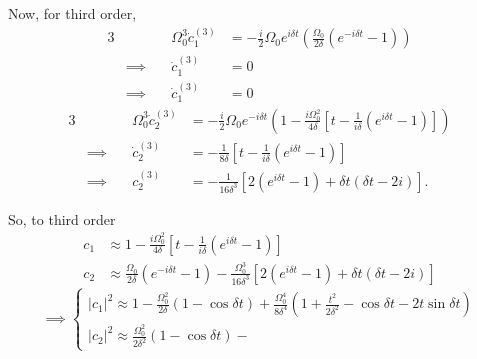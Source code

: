 \documentclass[12pt]{article}
\newcommand{\magsq}[1]{\big|#1\big|^2}
\begin{document}
Now, for third order,
\begin{alignat*}{3}
    &\quad & \Omega_0^3\dot{c}_1^{(3)} &= -\frac{i}{2}\Omega_0e^{i\delta t}\left(\frac{\Omega_0}{2\delta}\left(e^{-i\delta t} - 1\right)\right) \\
    &\implies\quad & \dot{c}_1^{(3)} &= 0 \\
    &\implies\quad & \dot{c}_1^{(3)} & = 0
\end{alignat*}
\begin{alignat*}{3}
    &\quad & \Omega_0^3\dot{c}_2^{(3)} &= -\frac{i}{2}\Omega_0e^{-i\delta t}\left(1 - \frac{i\Omega_0^2}{4\delta}\left[t - \frac{1}{i\delta}\left(e^{i\delta t} - 1\right)\right]\right) \\
    &\implies\quad & \dot{c}_2^{(3)} &= -\frac{1}{8\delta}\left[t - \frac{1}{i\delta}\left(e^{i\delta t} - 1\right)\right] \\
    &\implies\quad & c_2^{(3)} &= -\frac{1}{16\delta^3}\left[2\left(e^{i\delta t} - 1\right) + \delta t (\delta t - 2i)\right].
\end{alignat*}

So, to third order
\begin{equation*}
    \begin{aligned}
        c_1 &\approx 1 - \frac{i\Omega_0^2}{4\delta}\left[t - \frac{1}{i\delta}\left(e^{i\delta t} - 1\right)\right] \\
        c_2 &\approx \frac{\Omega_0}{2\delta}\left(e^{-i\delta t} - 1\right) - \frac{\Omega_0^3}{16\delta^3}\left[2\left(e^{i\delta t} - 1\right) + \delta t (\delta t - 2i)\right]
    \end{aligned}
\end{equation*}
\begin{equation*}
    \implies
    \begin{cases*}
        \magsq{c_1} \approx 1 - \frac{\Omega_0^2}{2\delta}\left(1 - \cos\delta t\right) + \frac{\Omega_0^4}{8\delta^4}\left(1 + \frac{t^2}{2\delta^2} - \cos\delta t - 2t\sin\delta t\right)  \\
        \magsq{c_2} \approx \frac{\Omega_0^2}{2\delta^2}\left(1 - \cos\delta t\right) - 
    \end{cases*}
\end{equation*}
\end{document}
